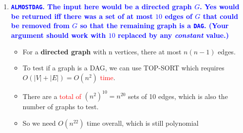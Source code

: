 \documentclass[11pt]{article}
\begin{document}
\begin{enumerate}
\begin{enumerate}
    \item \textbf{\textcolor{blue}{{\tt ALMOSTDAG}. The input here would be a directed graph $G$. Yes would be returned iff there was a set of at most $10$ edges of $G$ that could be removed from $G$ so that the remaining graph is a {\tt DAG}. (Your argument should work with $10$ replaced by any {\em constant} value.)}}
        \begin{itemize}
            \item For a \textbf{directed graph} with n vertices, there at most $n(n-1)$ edges.
            \item To test if a graph is a DAG, we can use TOP-SORT which requires $O(|V|+|E|) = O(n^2)$ \textcolor{red}{time}.
            \item There are a \textcolor{red}{total of} $(n^2)^{10} = n^{20}$ sets of 10 edges, which is also the number of graphs to test.
            \item So we need $O(n^{22})$ time overall, which is still polynomial
        \end{itemize}
\end{enumerate}
    

\end{enumerate}
\end{document}
